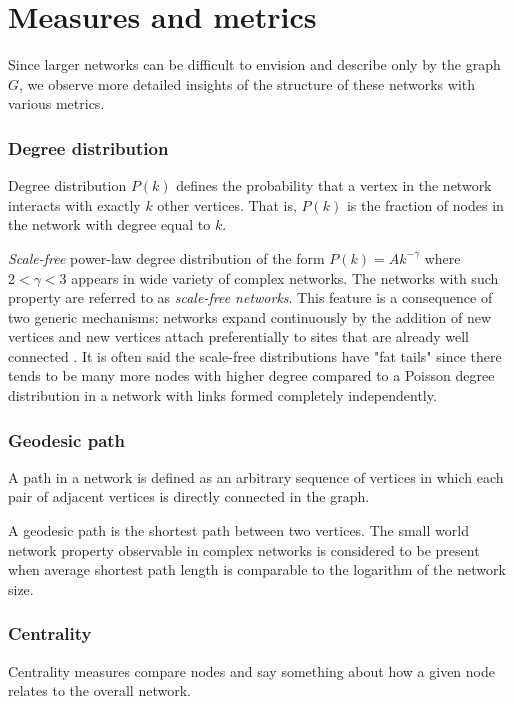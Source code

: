 \documentclass[times, utf8, diplomski]{fer}
\begin{document}
\section{Measures and metrics}
Since larger networks can be difficult to envision and describe only by the graph $G$, we observe more detailed insights of the structure of these networks with various metrics. 

\subsubsection{Degree distribution}
Degree distribution $P(k)$ defines the probability that a vertex in the network interacts with exactly $k$ other vertices. That is, $P(k)$ is the fraction of nodes in the network with degree equal to $k$.  

\emph{Scale-free} power-law degree distribution of the form $P(k) = Ak^{-\gamma}$ where $2<\gamma<3$ appears in wide variety of complex networks. The networks with such property are referred to as \emph{scale-free networks}. This feature is a consequence of two generic mechanisms: networks expand continuously by the addition of new vertices and new vertices attach preferentially to sites that are already well connected \cite{Barabasi99emergenceof}. It is often said the scale-free distributions have "fat tails" since there tends to be many more nodes with higher degree compared to a Poisson degree distribution in a network with links formed completely independently.


\subsubsection{Geodesic path}

A path in a network is defined as an arbitrary sequence of vertices in which each pair of adjacent vertices is  directly connected in the graph. 

A geodesic path is the shortest path between two vertices.
The small world network property observable in complex networks is considered to be present when average shortest path length is comparable to the logarithm of the network size. 

\subsubsection{Centrality}
Centrality measures compare  nodes and say something about how a given node relates to the overall network. 
\end{document}
